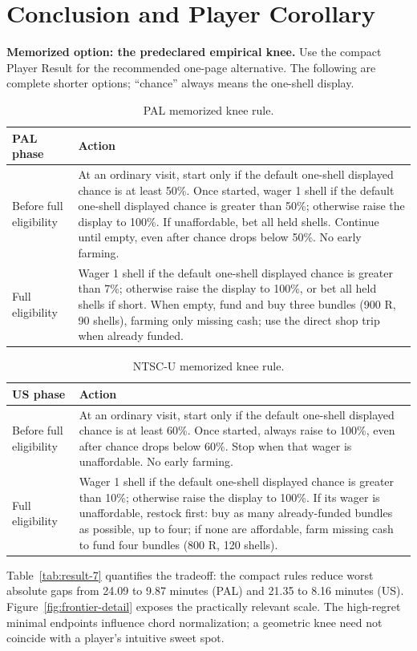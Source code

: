 \documentclass[11pt]{article}
\theoremstyle{definition}\newtheorem{definition}[theorem]{Definition}
\begin{document}
\section{Conclusion and Player Corollary}
\textbf{Memorized option: the predeclared empirical knee.} Use the compact Player Result for the recommended one-page alternative. The following are complete shorter options; ``chance'' always means the one-shell display.
\begin{table}[H]\centering\small
\begin{tabular}{p{.18\linewidth}p{.72\linewidth}}\toprule
PAL phase & Action\\\midrule
Before full eligibility & At an ordinary visit, start only if the default one-shell displayed chance is at least 50\%. Once started, wager 1 shell if the default one-shell displayed chance is greater than 50\%; otherwise raise the display to 100\%. If unaffordable, bet all held shells. Continue until empty, even after chance drops below 50\%. No early farming.\\
Full eligibility & Wager 1 shell if the default one-shell displayed chance is greater than 7\%; otherwise raise the display to 100\%, or bet all held shells if short. When empty, fund and buy three bundles (900 R, 90 shells), farming only missing cash; use the direct shop trip when already funded.\\\bottomrule
\end{tabular}\caption{PAL memorized knee rule.}\label{tab:pal-memorized}\end{table}
\begin{table}[H]\centering\small
\begin{tabular}{p{.18\linewidth}p{.72\linewidth}}\toprule
US phase & Action\\\midrule
Before full eligibility & At an ordinary visit, start only if the default one-shell displayed chance is at least 60\%. Once started, always raise to 100\%, even after chance drops below 60\%. Stop when that wager is unaffordable. No early farming.\\
Full eligibility & Wager 1 shell if the default one-shell displayed chance is greater than 10\%; otherwise raise the display to 100\%. If its wager is unaffordable, restock first: buy as many already-funded bundles as possible, up to four; if none are affordable, farm missing cash to fund four bundles (800 R, 120 shells).\\\bottomrule
\end{tabular}\caption{NTSC-U memorized knee rule.}\label{tab:us-memorized}\end{table}
Table~\ref{tab:result-7} quantifies the tradeoff: the compact rules reduce worst absolute gaps from 24.09 to 9.87 minutes (PAL) and 21.35 to 8.16 minutes (US). Figure~\ref{fig:frontier-detail} exposes the practically relevant scale. The high-regret minimal endpoints influence chord normalization; a geometric knee need not coincide with a player's intuitive sweet spot.
\end{document}
